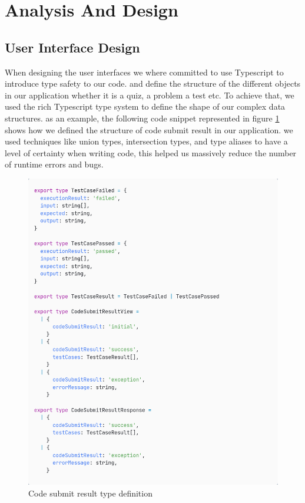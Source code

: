 \section{Analysis And Design}

\subsection{User Interface Design}
When designing the user interfaces we where committed to use Typescript to introduce type safety to our code.
and define the structure of the different objects in our application whether it is a quiz, a problem a test etc.
To achieve that, we used the rich Typescript type system to define the shape of our complex data structures.
as an example, the following code snippet represented in figure \ref{Code submit result type definition}
shows how we defined the structure of code submit result in our application.
we used techniques like union types, intersection types, and type aliases to have a level of certainty when writing
code, this helped us massively reduce the number of runtime errors and bugs.

\begin{figure}[h!]
  \centering
  \includegraphics[width=1\textwidth]{images/types.png}
  \caption{Code submit result type definition}\label{Code submit result type definition}
\end{figure}

